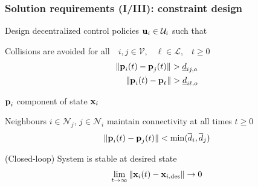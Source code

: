 \begin{frame} %
  \frametitle{Solution requirements (I/III): constraint design}

  Design decentralized control policies $\bm{\mathbf{u}}_i \in \mathcal{U}_i$ such that\\[3ex]

  \begin{gg_box}
  \begin{wideitemize}

    \item Collisions are avoided for all\ \ $i,j \in \mathcal{V}$,\ \ $\ell \in \mathcal{L}$,\ \ $t \geq 0$
      \begin{align}
        \|\bm{\mathbf{p}}_i(t) - \bm{\mathbf{p}}_{j}(t)\| > \underline{d}_{ij,a} \\
        \|\bm{\mathbf{p}}_i(t) - \bm{\mathbf{p}}_\ell\| > \underline{d}_{i\ell,o}
      \end{align}

      $\bm{\mathbf{p}}_i$ component of state $\bm{\mathbf{x}}_i$\\[3ex]


    \item Neighbours $i \in \mathcal{N}_j$, $j \in \mathcal{N}_i$
      maintain connectivity at all times $t \geq 0$
      \begin{align}
        \|\bm{\mathbf{p}}_i(t) - \bm{\mathbf{p}}_{j}(t)\| < \text{min}(\overline{d}_{i}, \overline{d}_{j})
      \end{align}
  \end{wideitemize}
  \end{gg_box}


  \begin{wideitemize}
    \item (Closed-loop) System is stable at desired state
      \begin{align}
        \lim\limits_{t \to \infty}\|\bm{\mathbf{x}}_i(t) - \bm{\mathbf{x}}_{i,\text{des}}\| \to 0 \\
      \end{align}

  \end{wideitemize}

\end{frame} %
